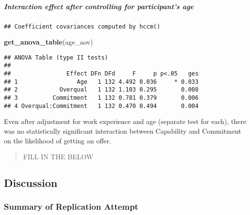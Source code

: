 \documentclass[]{article}
\newenvironment{Shaded}{\begin{snugshade}}{\end{snugshade}}
\newcommand{\KeywordTok}[1]{\textcolor[rgb]{0.13,0.29,0.53}{\textbf{#1}}}
\newcommand{\NormalTok}[1]{#1}
\newcommand{\OperatorTok}[1]{\textcolor[rgb]{0.81,0.36,0.00}{\textbf{#1}}}
\newcommand{\StringTok}[1]{\textcolor[rgb]{0.31,0.60,0.02}{#1}}
\let\oldsubparagraph\subparagraph
\renewcommand{\subparagraph}[1]{\oldsubparagraph{#1}\mbox{}}
\begin{document}
\hypertarget{interaction-effect-after-controlling-for-participants-age}{%
\subparagraph{Interaction effect after controlling for participant's
age}\label{interaction-effect-after-controlling-for-participants-age}}

\begin{Shaded}
\end{Shaded}

\begin{verbatim}
## Coefficient covariances computed by hccm()
\end{verbatim}

\begin{Shaded}
\begin{Highlighting}[]
\KeywordTok{get_anova_table}\NormalTok{(age_aov)}
\end{Highlighting}
\end{Shaded}

\begin{verbatim}
## ANOVA Table (type II tests)
## 
##                Effect DFn DFd     F     p p<.05   ges
## 1                 Age   1 132 4.492 0.036     * 0.033
## 2            Overqual   1 132 1.103 0.295       0.008
## 3          Commitment   1 132 0.781 0.379       0.006
## 4 Overqual:Commitment   1 132 0.470 0.494       0.004
\end{verbatim}

Even after adjustment for work experience and age (separate test for
each), there was no statistically significant interaction between
Capability and Commitment on the likelihood of getting an offer.

\begin{quote}
FILL IN THE BELOW
\end{quote}

\hypertarget{discussion}{%
\subsection{Discussion}\label{discussion}}

\hypertarget{summary-of-replication-attempt}{%
\subsubsection{Summary of Replication
Attempt}\label{summary-of-replication-attempt}}
\end{document}
